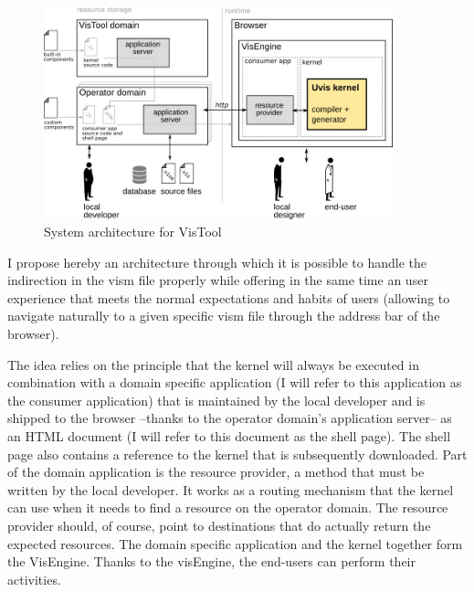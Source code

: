 \begin{figure}
    \centering
    \includegraphics[width=0.9\textwidth]{images/architecture_diagram.jpg}
    \caption{System architecture for VisTool}
    \label{img:architecture}
\end{figure}

I propose hereby an architecture through which it is possible to handle the indirection in the vism file properly while offering in the same time an user experience that meets the normal expectations and habits of users (allowing to navigate naturally to a given specific vism file through the address bar of the browser).

The idea relies on the principle that the kernel will always be executed in combination with a domain specific application (I will refer to this application as the consumer application) that is maintained by the local developer and is shipped to the browser --thanks to the operator domain's application server-- as an HTML document (I will refer to this document as the shell page). The shell page also contains a reference to the kernel that is subsequently downloaded. Part of the domain application is the resource provider, a method that must be written by the local developer. It works as a routing mechanism that the kernel can use when it needs to find a resource on the operator domain. The resource provider should, of course, point to destinations that do actually return the expected resources. The domain specific application and the kernel together form the VisEngine. Thanks to the visEngine, the end-users can perform their activities.


